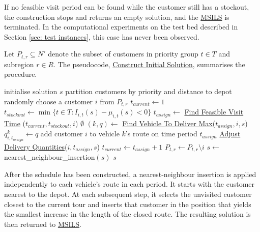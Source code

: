 \documentclass{article}
\begin{document}
If no feasible visit period can be found while the customer still has a stockout, the construction stops and returns an empty solution, and the \hyperref[alg:MSILS]{MSILS} is terminated. In the computational experiments on the test bed described in Section \ref{sec: test instances}, this case has never been observed.

Let $P_{t,r} \subseteq N'$ denote the subset of customers in priority group $t\in T$ and subregion $r\in R$. The pseudocode, \hyperref[alg:InitialSchedule]{Construct Initial Solution}, summarises the procedure.


\begin{algorithm}[H]
\captionsetup{labelformat=empty}
\caption{\textbf{Construct Initial Solution}}
\label{alg:InitialSchedule}
\begin{algorithmic}[1]
\STATE initialise solution $s$ \label{Initialise s} 
\STATE partition customers by priority and distance to depot
        \STATE randomly choose a customer $i$ from $P_{t,r}$
        \STATE $t_{current}\gets 1$
            \STATE $t_{stockout}\gets \min\{t\in T: I_{i,t}(s)-\mu_{i,t}(s) <0\}$
            \STATE $t_{assign}\gets$ \hyperref[alg:FindVisitTime]{Find Feasible Visit Time} ($t_{current}, t_{stockout}, i$)
                \RETURN $\emptyset$
            \ENDIF
            \STATE $(k,q)\gets $ \hyperref[alg:FindVehicleToDeliverMax]{Find Vehicle To Deliver Max}($t_{assign}, i, s$)
            \STATE $q^k_{i,t_{assign}}\gets q$
            \STATE add customer $i$ to vehicle $k$'s route on time period $t_{assign}$
            \STATE \hyperref[alg:AdjustDeliveryQuantities]{Adjust Delivery Quantities}($i, t_{assign}, s$)
            \STATE $t_{current}\gets t_{assign}+1$
        \ENDWHILE
        \STATE $P_{t,r}\gets P_{t,r}\setminus i$
    \ENDWHILE
\ENDFOR
\STATE $s\gets $nearest\_neighbour\_insertion$(s)$
\RETURN $s$ 
\end{algorithmic}
\end{algorithm}


After the schedule has been constructed, a nearest-neighbour insertion \cite{braysy2005vehicle} is applied independently to each vehicle's route in each period. It starts with the customer nearest to the depot. At each subsequent step, it selects the unvisited customer closest to the current tour and inserts that customer in the position that yields the smallest increase in the length of the closed route. The resulting solution is then returned to \hyperref[alg:MSILS]{MSILS}.
\end{document}

